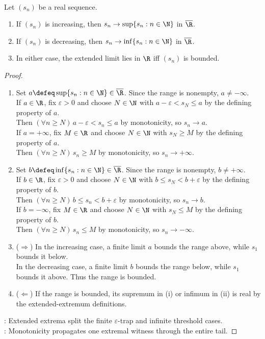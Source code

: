 \begin{proposition} \label{prop:monotone-sequence-extended-limit} \\
Let $(s_n)$ be a real sequence.
\begin{enumerate}[label=(\roman*)]
\setlength{\itemsep}{0pt}
\item If $(s_n)$ is increasing, then $s_n\to\sup\{s_n:n\in\N\}$ in $\overline{\R}$.
\item If $(s_n)$ is decreasing, then $s_n\to\inf\{s_n:n\in\N\}$ in $\overline{\R}$.
\item In either case, the extended limit lies in $\R$ iff $(s_n)$ is bounded.
\end{enumerate}
\begin{proof}
\begin{enumerate}[label=(\roman*)]
\setlength{\itemsep}{0pt}
\item[$(i)$] Set $a\defeq\sup\{s_n:n\in\N\}\in\overline{\R}$. Since the range is nonempty, $a\neq-\infty$.\\
If $a\in\R$, fix $\varepsilon>0$ and choose $N\in\N$ with $a-\varepsilon<s_N\leq a$ by the defining property of $a$.\\
Then $(\forall n\geq N)\,a-\varepsilon<s_n\leq a$ by monotonicity, so $s_n\to a$.\\
If $a=+\infty$, fix $M\in\R$ and choose $N\in\N$ with $s_N\geq M$ by the defining property of $a$.\\
Then $(\forall n\geq N)\,s_n\geq M$ by monotonicity, so $s_n\to+\infty$.
\item[$(ii)$] Set $b\defeq\inf\{s_n:n\in\N\}\in\overline{\R}$. Since the range is nonempty, $b\neq+\infty$.\\
If $b\in\R$, fix $\varepsilon>0$ and choose $N\in\N$ with $b\leq s_N<b+\varepsilon$ by the defining property of $b$.\\
Then $(\forall n\geq N)\,b\leq s_n<b+\varepsilon$ by monotonicity, so $s_n\to b$.\\
If $b=-\infty$, fix $M\in\R$ and choose $N\in\N$ with $s_N\leq M$ by the defining property of $b$.\\
Then $(\forall n\geq N)\,s_n\leq M$ by monotonicity, so $s_n\to-\infty$.
\item[$(iii)$] ($\Rightarrow$) In the increasing case, a finite limit $a$ bounds the range above, while $s_1$ bounds it below.\\
In the decreasing case, a finite limit $b$ bounds the range below, while $s_1$ bounds it above. Thus the range is bounded.
\item[$(iii)$] ($\Leftarrow$) If the range is bounded, its supremum in (i) or infimum in (ii) is real by the extended-extremum definitions.
\end{enumerate}
: Extended extrema split the finite $\varepsilon$-trap and infinite threshold cases.\\
: Monotonicity propagates one extremal witness through the entire tail.
\end{proof}
\end{proposition}

